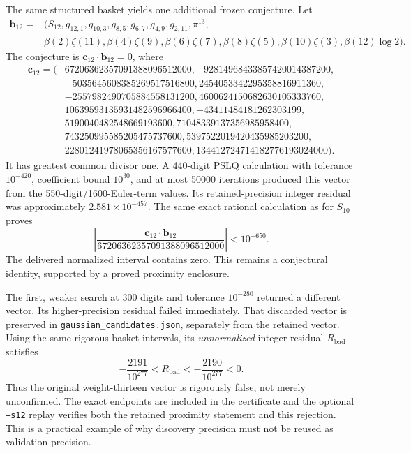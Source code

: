 \documentclass[11pt,letterpaper]{article}
\theoremstyle{definition}
\theoremstyle{remark}
\begin{document}
The same structured basket yields one additional frozen conjecture.
Let
\[
\begin{split}
 \mathbf b_{12}={}&(S_{12},g_{12,1},g_{10,3},g_{8,5},g_{6,7},g_{4,9},
 g_{2,11},\pi^{13},\\
 &\beta(2)\zeta(11),\beta(4)\zeta(9),\beta(6)\zeta(7),
 \beta(8)\zeta(5),\beta(10)\zeta(3),\beta(12)\log2).
\end{split}
\]
The conjecture is $\mathbf c_{12}\cdot\mathbf b_{12}=0$, where
\[
\begin{split}
\mathbf c_{12}=(&67206362357091388096512000,
-92814968433857420014387200,\\
&-5035645608385269517516800,
2454053342295358816911360,\\
&-2557982490705884558131200,
4600624150682630105333760,\\
&10639593135931482596966400,-43411484181262303199,\\
&5190040482548669193600,71048339137356985958400,\\
&743250995585205475737600,5397522019420435985203200,\\
&22801241978065356167577600,134412724714182776193024000).
\end{split}
\]
It has greatest common divisor one.  A 440-digit PSLQ calculation with
tolerance $10^{-420}$, coefficient bound $10^{30}$, and at most 50000
iterations produced this vector from the 550-digit/1600-Euler-term
values.  Its retained-precision integer residual was approximately
$2.581\times10^{-457}$.
The same exact rational calculation as for $S_{10}$ proves
\[
 \left|\frac{\mathbf c_{12}\cdot\mathbf b_{12}}
 {67206362357091388096512000}\right|<10^{-650}.
\]
The delivered normalized interval contains zero.  This remains a
conjectural identity, supported by a proved proximity enclosure.

The first, weaker search at 300 digits and tolerance $10^{-280}$
returned a different vector.  Its higher-precision residual failed
immediately.  That discarded vector is preserved in
\texttt{gaussian\_candidates.json}, separately from the retained vector.
Using the same rigorous basket intervals, its \emph{unnormalized}
integer residual $R_{\mathrm{bad}}$ satisfies
\[
 -\frac{2191}{10^{277}}<R_{\mathrm{bad}}
 <-\frac{2190}{10^{277}}<0.
\]
Thus the original weight-thirteen vector is rigorously false, not merely
unconfirmed.  The exact endpoints are included in the certificate and
the optional \texttt{--s12} replay verifies both the retained proximity
statement and this rejection.  This is a practical example of why
discovery precision must not be reused as validation precision.
\end{document}
